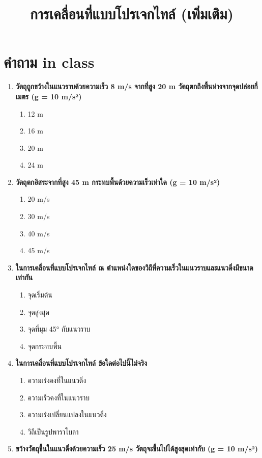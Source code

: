 \documentclass[12pt]{article}
\begin{document}
\title{การเคลื่อนที่แบบโปรเจกไทล์ (เพิ่มเติม)}
\maketitle
\section*{คำถาม in class}
\begin{enumerate}
\def\labelenumi{\arabic*.}
\normalfont
\item \textbf{วัตถุถูกขว้างในแนวราบด้วยความเร็ว 8 m/s จากที่สูง 20 m วัตถุตกถึงพื้นห่างจากจุดปล่อยกี่เมตร (g = 10 m/s²)}
\begin{enumerate}[label=\alph*)]
\item 12 m
\item 16 m
\item 20 m
\item 24 m
\end{enumerate}
\item \textbf{วัตถุตกอิสระจากที่สูง 45 m กระทบพื้นด้วยความเร็วเท่าใด (g = 10 m/s²)}
\begin{enumerate}[label=\alph*)]
\item 20 m/s
\item 30 m/s
\item 40 m/s
\item 45 m/s
\end{enumerate}
\item \textbf{ในการเคลื่อนที่แบบโปรเจกไทล์ ณ ตำแหน่งใดของวิถีที่ความเร็วในแนวราบและแนวดิ่งมีขนาดเท่ากัน}
\begin{enumerate}[label=\alph*)]
\item จุดเริ่มต้น
\item จุดสูงสุด
\item จุดที่มุม 45° กับแนวราบ
\item จุดกระทบพื้น
\end{enumerate}
\item \textbf{ในการเคลื่อนที่แบบโปรเจกไทล์ ข้อใดต่อไปนี้ไม่จริง}
\begin{enumerate}[label=\alph*)]
\item ความเร่งคงที่ในแนวดิ่ง
\item ความเร็วคงที่ในแนวราบ
\item ความเร่งเปลี่ยนแปลงในแนวดิ่ง
\item วิถีเป็นรูปพาราโบลา
\end{enumerate}
\item \textbf{ขว้างวัตถุขึ้นในแนวดิ่งด้วยความเร็ว 25 m/s วัตถุจะขึ้นไปได้สูงสุดเท่ากับ (g = 10 m/s²)}

\end{enumerate}
\end{document}
